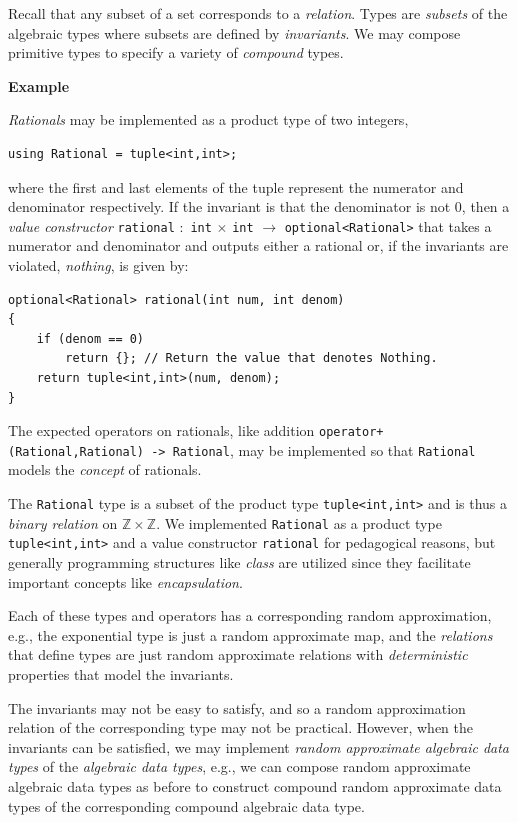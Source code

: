 \documentclass[11pt,final,hidelinks]{article}
\newcommand{\Z}{\mathbb{Z}}        %
\theoremstyle{plain}
\newcounter{examplecounter}
\newenvironment{example}
{
    \refstepcounter{examplecounter}%
    \par\vspace{\baselineskip}\noindent
    \textbf{Example \theexamplecounter}%
    \begin{itshape}
    \quad
}
{
    \end{itshape}
    \par\vspace{\baselineskip}%
    \noindent\ignorespacesafterend
}
\newenvironment{remark}
  {\pushQED{\qed}\renewcommand{\qedsymbol}{$\triangle$}\remarkx}
  {\popQED\endremarkx}
\begin{document}
Recall that any subset of a set corresponds to a \emph{relation}. Types are \emph{subsets} of the algebraic types where subsets are defined by \emph{invariants}.
We may compose primitive types to specify a variety of \emph{compound} types.
\begin{example}
\emph{Rationals} may be implemented as a product type of two integers,
\begin{lstlisting}
using Rational = tuple<int,int>;
\end{lstlisting}
where the first and last elements of the tuple represent the numerator and denominator respectively.
If the invariant is that the denominator is not $0$, then a \emph{value constructor} \lstinline{rational} $:$ \lstinline{int} $\times$ \lstinline{int} $\to$ \lstinline{optional<Rational>} that takes a numerator and denominator and outputs either a rational or, if the invariants are violated, \emph{nothing}, is given by:
\begin{lstlisting}
optional<Rational> rational(int num, int denom)
{
    if (denom == 0)
        return {}; // Return the value that denotes Nothing.
    return tuple<int,int>(num, denom);
}
\end{lstlisting}

The expected operators on rationals, like addition \lstinline{operator+(Rational,Rational) -> Rational}, may be implemented so that \lstinline{Rational} models the \emph{concept} of rationals.

The \lstinline{Rational} type is a subset of the product type \lstinline{tuple<int,int>} and is thus
a \emph{binary relation} on $\Z \times \Z$.
\begin{remark}
We implemented \lstinline{Rational} as a product type \lstinline{tuple<int,int>} and a value constructor \lstinline{rational} for pedagogical reasons, but generally programming structures like \emph{class} are utilized since they facilitate important concepts like \emph{encapsulation}.
\end{remark}
\end{example}

Each of these types and operators has a corresponding random approximation, e.g., the exponential type is just a random approximate map, and the \emph{relations} that define types are just random approximate relations with \emph{deterministic} properties that model the invariants.

The invariants may not be easy to satisfy, and so a random approximation relation of the corresponding type may not be practical.
However, when the invariants can be satisfied, we may implement \emph{random approximate algebraic data types} of the \emph{algebraic data types}, e.g., we can compose random approximate algebraic data types as before to construct compound random approximate data types of the corresponding compound algebraic data type.
\end{document}
